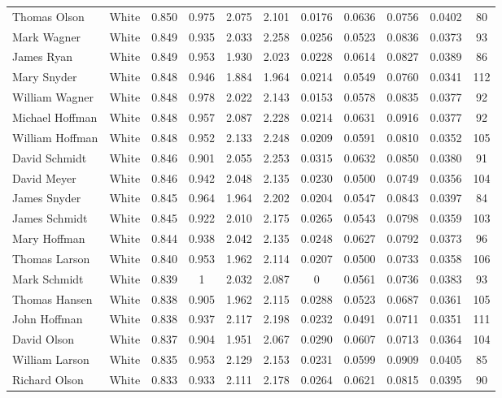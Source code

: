 \documentclass[]{article}
\begin{document}
\begin{tabular}{lcccccccccc}
Thomas Olson & White & 0.850 & 0.975 & 2.075 & 2.101 & 0.0176 & 0.0636 & 0.0756 & 0.0402 & 80 \\
Mark Wagner & White & 0.849 & 0.935 & 2.033 & 2.258 & 0.0256 & 0.0523 & 0.0836 & 0.0373 & 93 \\
James Ryan & White & 0.849 & 0.953 & 1.930 & 2.023 & 0.0228 & 0.0614 & 0.0827 & 0.0389 & 86 \\
Mary Snyder & White & 0.848 & 0.946 & 1.884 & 1.964 & 0.0214 & 0.0549 & 0.0760 & 0.0341 & 112 \\
William Wagner & White & 0.848 & 0.978 & 2.022 & 2.143 & 0.0153 & 0.0578 & 0.0835 & 0.0377 & 92 \\
Michael Hoffman & White & 0.848 & 0.957 & 2.087 & 2.228 & 0.0214 & 0.0631 & 0.0916 & 0.0377 & 92 \\
William Hoffman & White & 0.848 & 0.952 & 2.133 & 2.248 & 0.0209 & 0.0591 & 0.0810 & 0.0352 & 105 \\
David Schmidt & White & 0.846 & 0.901 & 2.055 & 2.253 & 0.0315 & 0.0632 & 0.0850 & 0.0380 & 91 \\
David Meyer & White & 0.846 & 0.942 & 2.048 & 2.135 & 0.0230 & 0.0500 & 0.0749 & 0.0356 & 104 \\
James Snyder & White & 0.845 & 0.964 & 1.964 & 2.202 & 0.0204 & 0.0547 & 0.0843 & 0.0397 & 84 \\
James Schmidt & White & 0.845 & 0.922 & 2.010 & 2.175 & 0.0265 & 0.0543 & 0.0798 & 0.0359 & 103 \\
Mary Hoffman & White & 0.844 & 0.938 & 2.042 & 2.135 & 0.0248 & 0.0627 & 0.0792 & 0.0373 & 96 \\
Thomas Larson & White & 0.840 & 0.953 & 1.962 & 2.114 & 0.0207 & 0.0500 & 0.0733 & 0.0358 & 106 \\
Mark Schmidt & White & 0.839 & 1 & 2.032 & 2.087 & 0 & 0.0561 & 0.0736 & 0.0383 & 93 \\
Thomas Hansen & White & 0.838 & 0.905 & 1.962 & 2.115 & 0.0288 & 0.0523 & 0.0687 & 0.0361 & 105 \\
John Hoffman & White & 0.838 & 0.937 & 2.117 & 2.198 & 0.0232 & 0.0491 & 0.0711 & 0.0351 & 111 \\
David Olson & White & 0.837 & 0.904 & 1.951 & 2.067 & 0.0290 & 0.0607 & 0.0713 & 0.0364 & 104 \\
William Larson & White & 0.835 & 0.953 & 2.129 & 2.153 & 0.0231 & 0.0599 & 0.0909 & 0.0405 & 85 \\
Richard Olson & White & 0.833 & 0.933 & 2.111 & 2.178 & 0.0264 & 0.0621 & 0.0815 & 0.0395 & 90 \\

\end{tabular}
\end{document}
